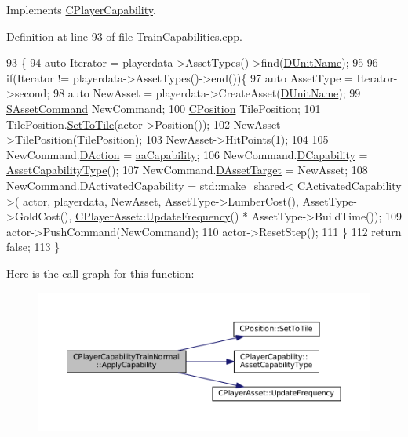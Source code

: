 Implements \hyperlink{classCPlayerCapability_a2ca6fd7fbd9c0178f1cf1d049c63825f}{C\+Player\+Capability}.



Definition at line 93 of file Train\+Capabilities.\+cpp.


\begin{DoxyCode}
93                                                                                                            
                                                               \{
94     \textcolor{keyword}{auto} Iterator = playerdata->AssetTypes()->find(\hyperlink{classCPlayerCapabilityTrainNormal_aed40686355e78c151910e23ea2d9d32c}{DUnitName});
95     
96     \textcolor{keywordflow}{if}(Iterator != playerdata->AssetTypes()->end())\{
97         \textcolor{keyword}{auto} AssetType = Iterator->second;
98         \textcolor{keyword}{auto} NewAsset = playerdata->CreateAsset(\hyperlink{classCPlayerCapabilityTrainNormal_aed40686355e78c151910e23ea2d9d32c}{DUnitName});
99         \hyperlink{structSAssetCommand}{SAssetCommand} NewCommand;
100         \hyperlink{classCPosition}{CPosition} TilePosition;
101         TilePosition.\hyperlink{classCPosition_ae302aa21792de64c97de29e2cbbfeb94}{SetToTile}(actor->Position());
102         NewAsset->TilePosition(TilePosition);
103         NewAsset->HitPoints(1);
104         
105         NewCommand.\hyperlink{structSAssetCommand_a8edd3b3d59a76d5514ba403bc8076a75}{DAction} = \hyperlink{GameDataTypes_8h_ab47668e651a3032cfb9c40ea2d60d670acf9fb164e8abd71c71f4a8c7fda360d4}{aaCapability};
106         NewCommand.\hyperlink{structSAssetCommand_a734ea7c6847457b437360f333f570ff9}{DCapability} = \hyperlink{classCPlayerCapability_a433bb196cd6ab6a932f1cac102b3aa98}{AssetCapabilityType}();
107         NewCommand.\hyperlink{structSAssetCommand_a3d9b43f6e59c386c48c41a65448a0c39}{DAssetTarget} = NewAsset;
108         NewCommand.\hyperlink{structSAssetCommand_ad8beda19520811cc70fe1eab16c774dd}{DActivatedCapability} = std::make\_shared< CActivatedCapability >(
      actor, playerdata, NewAsset, AssetType->LumberCost(), AssetType->GoldCost(), 
      \hyperlink{classCPlayerAsset_a0aff85b9552967a42f4f3f42cb59c19f}{CPlayerAsset::UpdateFrequency}() * AssetType->BuildTime());
109         actor->PushCommand(NewCommand);
110         actor->ResetStep();
111     \}
112     \textcolor{keywordflow}{return} \textcolor{keyword}{false};
113 \}
\end{DoxyCode}
Here is the call graph for this function\+:
\nopagebreak
\begin{figure}[H]
\begin{center}
\leavevmode
\includegraphics[width=350pt]{classCPlayerCapabilityTrainNormal_a04ed166d2072d44ddc96735ac1beb9bc_cgraph}
\end{center}
\end{figure}
